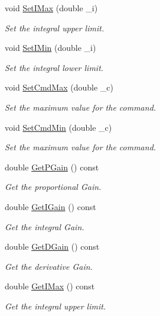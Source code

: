 \begin{DoxyCompactItemize}
void \hyperlink{classnubot_1_1PID_a7a605b62cd1355c137ac6e87911fc83f}{Set\-I\-Max} (double \-\_\-i)
\begin{DoxyCompactList}\small\item\em Set the integral upper limit. \end{DoxyCompactList}\item 
void \hyperlink{classnubot_1_1PID_abdfd118371fe19fcf63c56dee66892f2}{Set\-I\-Min} (double \-\_\-i)
\begin{DoxyCompactList}\small\item\em Set the integral lower limit. \end{DoxyCompactList}\item 
void \hyperlink{classnubot_1_1PID_a756b27c805adea693e9af92c767aa981}{Set\-Cmd\-Max} (double \-\_\-c)
\begin{DoxyCompactList}\small\item\em Set the maximum value for the command. \end{DoxyCompactList}\item 
void \hyperlink{classnubot_1_1PID_a2124f2b2e8d7b9b8aa1a933ac412a5d1}{Set\-Cmd\-Min} (double \-\_\-c)
\begin{DoxyCompactList}\small\item\em Set the maximum value for the command. \end{DoxyCompactList}\item 
double \hyperlink{classnubot_1_1PID_a1c0443f163e53483369989c4f185b84e}{Get\-P\-Gain} () const 
\begin{DoxyCompactList}\small\item\em Get the proportional Gain. \end{DoxyCompactList}\item 
double \hyperlink{classnubot_1_1PID_a9aa6fdeab746f430822c02d719a8ba7a}{Get\-I\-Gain} () const 
\begin{DoxyCompactList}\small\item\em Get the integral Gain. \end{DoxyCompactList}\item 
double \hyperlink{classnubot_1_1PID_aee309a8f184f0a2de417d24513f7e48a}{Get\-D\-Gain} () const 
\begin{DoxyCompactList}\small\item\em Get the derivative Gain. \end{DoxyCompactList}\item 
double \hyperlink{classnubot_1_1PID_a49f73670f78e53265eae69338c084062}{Get\-I\-Max} () const 
\begin{DoxyCompactList}\small\item\em Get the integral upper limit. \end{DoxyCompactList}\item 

\end{DoxyCompactItemize}
